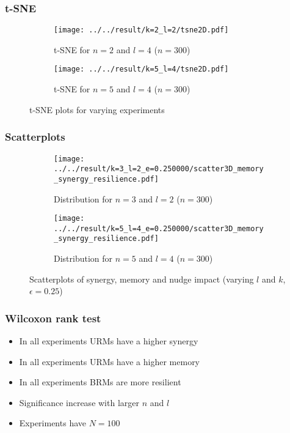 \documentclass[hyperref={pdfpagelabels=false}]{beamer}
\begin{document}
\begin{frame}
\frametitle{t-SNE}
\begin{figure}[ht]
    \centering
    \begin{subfigure}[b]{0.48\textwidth}
        \texttt{[image: ../../result/k=2\_l=2/tsne2D.pdf]}
        \caption{t-SNE for $n=2$ and $l=4$ ($n=300$)}
    \end{subfigure}
    \begin{subfigure}[b]{0.48\textwidth}
        \texttt{[image: ../../result/k=5\_l=4/tsne2D.pdf]}
        \caption{t-SNE for $n=5$ and $l=4$ ($n=300$)}
    \end{subfigure}
    \caption{t-SNE plots for varying experiments}
    \label{fig:TSNE}
\end{figure}
\end{frame}

\begin{frame}
\frametitle{Scatterplots}
\begin{figure}[ht]
    \centering
    \begin{subfigure}[b]{0.48\textwidth}
        \texttt{[image: ../../result/k=3\_l=2\_e=0.250000/scatter3D\_memory\_synergy\_resilience.pdf]}
        \caption{Distribution for $n=3$ and $l=2$ ($n=300$)}
    \end{subfigure}
    \begin{subfigure}[b]{0.48\textwidth}
        \texttt{[image: ../../result/k=5\_l=4\_e=0.250000/scatter3D\_memory\_synergy\_resilience.pdf]}
        \caption{Distribution for $n=5$ and $l=4$ ($n=300$)}
    \end{subfigure}
    \caption{Scatterplots of synergy, memory and nudge impact (varying $l$ and $k$, $\epsilon = 0.25$)}
    \label{fig:3dscatter}
\end{figure}
\end{frame}

\begin{frame}
\frametitle{Wilcoxon rank test}
\begin{itemize}
\item In all experiments URMs have a higher synergy
\item In all experiments URMs have a higher memory
\item In all experiments BRMs are more resilient
\item Significance increase with larger $n$ and $l$
\item Experiments have $N = 100$
\end{itemize}
\end{frame}
\end{document}
